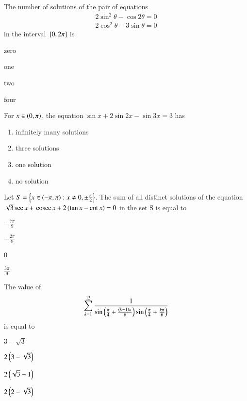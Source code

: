 \item The number of solutions of the pair of equations
\begin{align*}
2\sin^2\theta - \cos2\theta = 0\\
2\cos^2\theta - 3\sin\theta = 0
\end{align*}
in the interval ${}\left[0,2\pi\right]$ is
\hfill{}
\begin{enumerate}
\begin{multicols}{2}
\item zero
\columnbreak
\item one
\end{multicols}
\begin{multicols}{2}
\item two
\columnbreak
\item four
\end{multicols}
\end{enumerate}
\item For $x \in \left(0,\pi\right)$, the equation $\sin x + 2\sin 2x - \sin 3x = 3$ has
\hfill{}
\begin{enumerate}
\item infinitely many solutions
\item three solutions
\item one solution
\item no solution
\end{enumerate}
\item Let $S = \left\{x \in \left(-\pi,\pi\right) : x \neq 0, \pm \frac{\pi}{2}\right\}$. The sum of all distinct solutions of the equation $\sqrt{3} \sec x + \,\text{cosec}\, x + 2\left(\tan x - \cot x\right) = 0$ in the set S is equal to
\hfill{}
\begin{enumerate}
\begin{multicols}{2}
\item $-\frac{7\pi}{9}$
\columnbreak
\item $-\frac{2\pi}{9}$
\end{multicols}
\begin{multicols}{2}
\item 0
\columnbreak
\item $\frac{5\pi}{9}$
\end{multicols}
\end{enumerate}
\item The value of 
\begin{align*}
\sum_{k=1}^{13} \frac{1}{\sin\left(\frac{\pi}{4} + \frac{\left(k-1\right)\pi}{6}\right)\sin\left(\frac{\pi}{4} + \frac{k\pi}{6}\right)}
\end{align*}
is equal to
\hfill{}
\begin{enumerate}
\begin{multicols}{2}
\item $3-\sqrt{3}$
\columnbreak
\item $2\left(3-\sqrt{3}\right)$
\end{multicols}
\begin{multicols}{2}
\item $2\left(\sqrt{3}-1\right)$
\columnbreak
\item $2\left(2-\sqrt{3}\right)$
\end{multicols}
\end{enumerate}
